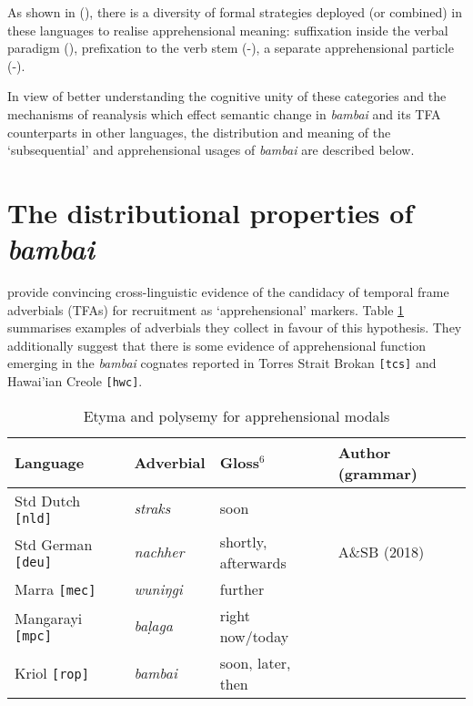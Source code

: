 \documentclass[11pt]{article}
\begin{document}
\xe



As shown in (\lastx), there is a diversity of formal strategies deployed (or combined) in these languages to realise apprehensional meaning: suffixation inside the verbal paradigm (), prefixation to the verb stem (-), a separate apprehensional particle (-).


 In view of better understanding the cognitive unity of these categories and the mechanisms of reanalysis which effect semantic change in \textit{bambai} and its TFA counterparts in other languages, the distribution and meaning of the `subsequential' and apprehensional usages of \textit{bambai} are described below.
 
 
\section{The distributional properties of \textit{bambai}}\label{dataS}

\citet{Angelo2016} provide convincing cross-linguistic evidence of the candidacy of temporal frame adverbials (TFAs) for recruitment as `apprehensional' markers. Table \ref{etyma} summarises examples of adverbials they collect in favour of this hypothesis. They additionally suggest that there is some evidence of apprehensional function emerging in the \textit{bambai} cognates reported in Torres Strait Brokan \texttt{[tcs]} and Hawai'ian Creole \texttt{[hwc]}.

\begin{table}[h!]\centering
	\caption{Etyma and polysemy for apprehensional modals} \label{etyma}
	\begin{tabular}{llll}
		Language & Adverbial & Gloss$^6$ & Author (grammar)\\\midrule
		Std Dutch \texttt{[nld]} & \textit{straks} & soon & \citet{Boogaart2009,Boogaart2020}\\
		Std German \texttt{[deu]} & \textit{nachher} & shortly, afterwards&A\&SB (2018)\\
		Marra \texttt{[mec]}& \textit{wuniŋgi} & further & \citet{Heath1981}\\
		Mangarayi \texttt{[mpc]} & \textit{baḷaga} & right now/today & \citet{Merlan1989}\\ 
		Kriol \texttt{[rop]} &  \textit{bambai} & soon, later, then& \\\bottomrule
	\end{tabular}\end{table}
	\vspace{.25cm}
\end{document}
